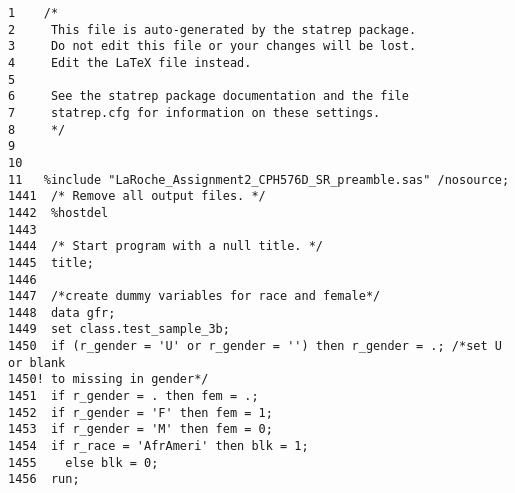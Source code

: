 \documentclass{article}\usepackage[]{graphicx}\usepackage[]{color}
\begin{document}
\begin{verbatim}
1    /*
2     This file is auto-generated by the statrep package.
3     Do not edit this file or your changes will be lost.
4     Edit the LaTeX file instead.
5
6     See the statrep package documentation and the file
7     statrep.cfg for information on these settings.
8     */
9
10
11   %include "LaRoche_Assignment2_CPH576D_SR_preamble.sas" /nosource;
1441  /* Remove all output files. */
1442  %hostdel
1443
1444  /* Start program with a null title. */
1445  title;
1446
1447  /*create dummy variables for race and female*/
1448  data gfr;
1449  set class.test_sample_3b;
1450  if (r_gender = 'U' or r_gender = '') then r_gender = .; /*set U or blank
1450! to missing in gender*/
1451  if r_gender = . then fem = .;
1452  if r_gender = 'F' then fem = 1;
1453  if r_gender = 'M' then fem = 0;
1454  if r_race = 'AfrAmeri' then blk = 1;
1455    else blk = 0;
1456  run;


\end{verbatim}
\end{document}
